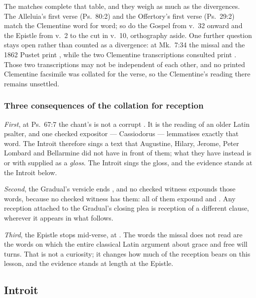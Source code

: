 The matches complete that table, and they weigh as much as the
divergences. The Alleluia's first verse (Ps.~80:2) and the Offertory's first
verse (Ps.~29:2) match the Clementine word for word; so do the Gospel from
v.~32 onward and the Epistle from v.~2 to the cut in v.~10, orthography aside.
One further question stays open rather than counted as a divergence: at
Mk.~7:34 the missal and the 1862 Pustet print ,
while the two Clementine transcriptions consulted print .
Those two transcriptions may not be independent of each other, and no printed
Clementine facsimile was collated for the verse, so the Clementine's reading there
remains unsettled.

\subsubsection*{Three consequences of the collation for reception}

\textit{First}, at Ps.~67:7 the chant's  is not a corrupt
. It is the reading of an older Latin psalter, and one
checked expositor --- Cassiodorus --- lemmatises exactly that word. The Introit
therefore sings a text that Augustine, Hilary, Jerome, Peter Lombard and
Bellarmine did not have in front of them; what they have instead is
 or  with  supplied as a
\textit{gloss}. The Introit sings the gloss, and the evidence stands at the
Introit below.

\textit{Second}, the Gradual's versicle ends , and no
checked witness expounds those words, because no checked witness has them: all
of them expound  and . Any reception
attached to the Gradual's closing plea is reception of a different clause,
wherever it appears in what follows.

\textit{Third}, the Epistle stops mid-verse, at . The words the missal does not read are the words on which the
entire classical Latin argument about grace and free will turns. That is not a
curiosity; it changes how much of the reception bears on this lesson, and
the evidence stands at length at the Epistle.

\elementguard
\subsection*{Introit }

